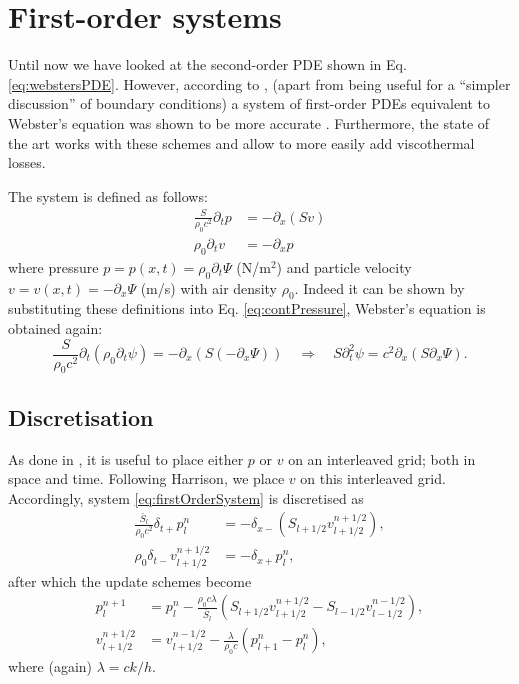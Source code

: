 \documentclass[dvipsnames]{article}
\begin{document}
\section{First-order systems}
Until now we have looked at the second-order PDE shown in Eq. \eqref{eq:webstersPDE}. However, according to \cite{Harrison2018}, (apart from being useful for a ``simpler discussion'' of boundary conditions) a system of first-order PDEs equivalent to Webster's equation was shown to be more accurate \cite{Torin2015}. Furthermore, the state of the art \cite{Harrison2018, Harrison2016} works with these schemes and allow to more easily add viscothermal losses.

The system is defined as follows:
\begin{subequations}\label{eq:firstOrderSystem}
\begin{align}
    \frac{S}{\rho_0 c^2}\partial_t p &= -\partial_x(Sv)\label{eq:contPressure}\\
    \rho_0\partial_tv &= -\partial_xp\label{eq:discVelocity}
\end{align}
\end{subequations}
where pressure $p = p(x,t) = \rho_0\partial_t \Psi$ (N/m$^2$) and particle velocity $v = v(x,t) = -\partial_x\Psi$ (m/s) with air density $\rho_0$. Indeed it can be shown by substituting these definitions into Eq. \eqref{eq:contPressure}, Webster's equation is obtained again:
\begin{equation}
  \nonumber
        \frac{S}{\rho_0 c^2}\partial_t(\rho_0 \partial_t\psi) = -\partial_x(S(-\partial_x\Psi))\quad \Longrightarrow \quad S\partial_t^2\psi = c^2\partial_x(S\partial_x\Psi).
\end{equation}
\subsection{Discretisation}
As done in \cite{Harrison2018}, it is useful to place either $p$ or $v$ on an interleaved grid; both in space and time. Following Harrison, we place $v$ on this interleaved grid. Accordingly, system \eqref{eq:firstOrderSystem} is discretised as
\begin{subequations}
    \begin{align}
        \frac{\bar S_l}{\rho_0 c^2}\delta_{t+}p_l^n &= -\delta_{x-}(S_{l+1/2}v_{l+1/2}^{n+1/2}),\label{eq:discPressure}\\
        \rho_0 \delta_{t-}v_{l+1/2}^{n+1/2}&=-\delta_{x+}p_l^n,\label{eq:discVelocity}
    \end{align}
\end{subequations}
after which the update schemes become
\begin{subequations}
    \begin{align}
        p_l^{n+1} &= p_l^n - \frac{\rho_0 c \lambda}{\bar{S}_l}(S_{l+1/2}v_{l+1/2}^{n+1/2}-S_{l-1/2}v_{l-1/2}^{n-1/2}),\label{eq:pressureUpdate}\\
        v_{l+1/2}^{n+1/2} &= v_{l+1/2}^{n-1/2}-\frac{\lambda}{\rho_0 c}(p_{l+1}^n - p_l^n),\label{eq:velocityUpdate}
    \end{align}
\end{subequations}
where (again) $\lambda = ck/h$.
\end{document}
